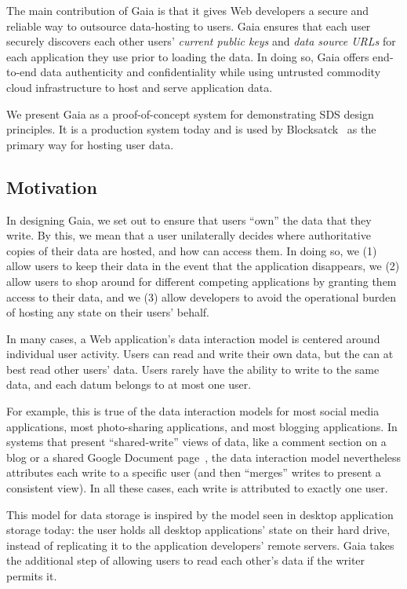 The main contribution of Gaia is that it gives Web developers a secure and
reliable way to outsource data-hosting to users.  Gaia ensures that each user
securely discovers each other users' \emph{current public keys} and \emph{data
source URLs} for each application they use prior to loading the data.
In doing so, Gaia offers end-to-end
data authenticity and confidentiality while using untrusted commodity cloud infrastructure
to host and serve application data.

We present Gaia as a proof-of-concept system for demonstrating SDS design
principles.  It is a production system today and is used by
Blocksatck~\cite{applications} as the primary way for hosting user data.

\subsection{Motivation}

In designing Gaia, we set out to ensure that users ``own'' the data that they
write.  By this, we mean that a user unilaterally decides where authoritative
copies of their data are hosted, and how can access them.  In doing so, we 
(1) allow users to keep their data in the event that the application disappears, we
(2) allow users to shop around for different competing applications by granting them
access to their data, and we (3) allow developers to avoid the operational burden of
hosting any state on their users' behalf.

In many cases, a Web application's data interaction model is centered around
individual user activity.  Users can read and write their own data, but the can
at best read other users' data.  Users rarely have the ability to write to the
same data, and each datum belongs to at most one user.

For example, this is
true of the data interaction models for most social media applications,
most photo-sharing applications, and most blogging applications.  In systems
that present ``shared-write'' views of data, like a comment section on a blog or
a shared Google Document page~\cite{google-docs}, the data interaction model
nevertheless attributes each write to a specific user (and then ``merges''
writes to present a consistent view).  In all these cases, each write is
attributed to exactly one user.

This model for data storage is
inspired by the model seen in desktop application storage today:  the user holds all
desktop applications' state on their hard drive, instead of replicating it to
the application developers' remote servers.  Gaia takes the additional step of
allowing users to read each other's data if the writer permits it.

